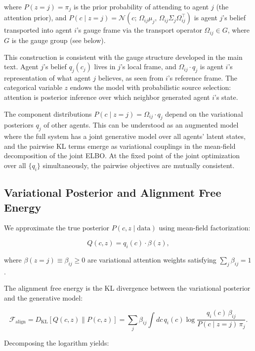 \documentclass[12pt]{article}
\begin{document}
where $P(z = j) = \pi_j$ is the prior probability of attending to agent $j$ (the attention prior), and $P(c \mid z = j) = \mathcal{N}(c;\, \Omega_{ij}\mu_j,\, \Omega_{ij}\Sigma_j\Omega_{ij}^\top)$ is agent $j$'s belief transported into agent $i$'s gauge frame via the transport operator $\Omega_{ij} \in G$, where $G$ is the gauge group (see below).

This construction is consistent with the gauge structure developed in the main text. Agent $j$'s belief $q_j(c_j)$ lives in $j$'s local frame, and $\Omega_{ij} \cdot q_j$ is agent $i$'s representation of what agent $j$ believes, as seen from $i$'s reference frame. The categorical variable $z$ endows the model with probabilistic source selection: attention is posterior inference over which neighbor generated agent $i$'s state.

The component distributions $P(c \mid z{=}j) = \Omega_{ij} \cdot q_j$ depend on the variational posteriors $q_j$ of other agents. This can be understood as an augmented model where the full system has a joint generative model over all agents' latent states, and the pairwise KL terms emerge as variational couplings in the mean-field decomposition of the joint ELBO. At the fixed point of the joint optimization over all $\{q_i\}$ simultaneously, the pairwise objectives are mutually consistent.

\subsection{Variational Posterior and Alignment Free Energy}

We approximate the true posterior $P(c, z \mid \text{data})$ using mean-field factorization:

\begin{equation}
Q(c, z) = q_i(c) \cdot \beta(z),
\end{equation}

where $\beta(z = j) \equiv \beta_{ij} \geq 0$ are variational attention weights satisfying $\sum_j \beta_{ij} = 1$.

The alignment free energy is the KL divergence between the variational posterior and the generative model:

\begin{equation}
\mathcal{F}_{\text{align}} = D_{\mathrm{KL}}[Q(c,z) \| P(c,z)] = \sum_j \beta_{ij} \int dc\, q_i(c) \log \frac{q_i(c)\, \beta_{ij}}{P(c \mid z{=}j)\, \pi_j}.
\end{equation}

Decomposing the logarithm yields:
\end{document}
